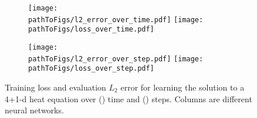 \begin{figure}[!h]
  \centering
  \def\pathToFigs{kfac_pinns_exp/exp30_heat4d_groupplot}
  \begin{subfigure}[t]{1.0\linewidth}
    \caption{}\label{subfig:heat4d-time}
    \texttt{[image: \\pathToFigs/l2\_error\_over\_time.pdf]}
    \texttt{[image: \\pathToFigs/loss\_over\_time.pdf]}
  \end{subfigure}
  \begin{subfigure}[t]{1.0\linewidth}
    \caption{}\label{subfig:heat4d-step}
    \texttt{[image: \\pathToFigs/l2\_error\_over\_step.pdf]}
    \texttt{[image: \\pathToFigs/loss\_over\_step.pdf]}
  \end{subfigure}
  \caption{Training loss and evaluation $L_2$ error for learning the solution to a 4+1-d heat equation over () time and () steps.
    Columns are different neural networks.}\label{fig:heat4d-appendix}
\end{figure}

